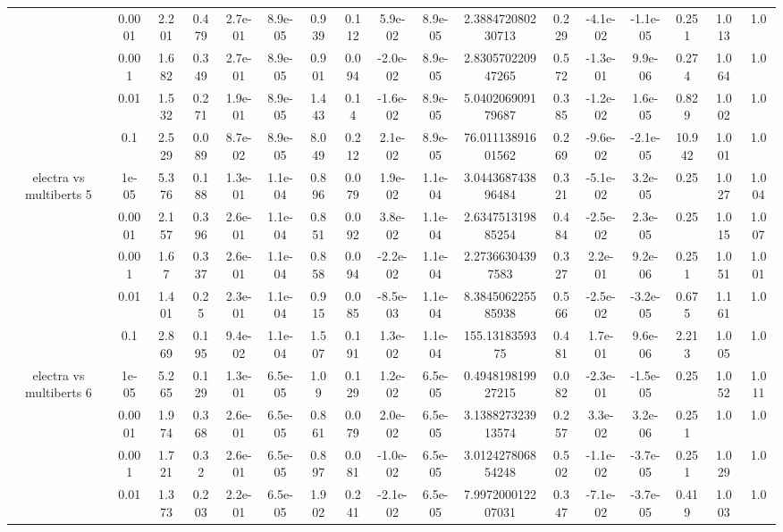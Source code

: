 \begin{tabular}{|c|c|c|c|c|c|c|c|c|c|c|c|c|c|c|c|c|}
 & 0.0001 & 2.201 & 0.479 & 2.7e-01 & 8.9e-05 & 0.939 & 0.112 & 5.9e-02 & 8.9e-05 & 2.388472080230713 & 0.229 & -4.1e-02 & -1.1e-05 & 0.251 & 1.013 & 1.0 \\
 & 0.001 & 1.682 & 0.349 & 2.7e-01 & 8.9e-05 & 0.901 & 0.094 & -2.0e-02 & 8.9e-05 & 2.830570220947265 & 0.572 & -1.3e-01 & 9.9e-06 & 0.274 & 1.064 & 1.0 \\
 & 0.01 & 1.532 & 0.271 & 1.9e-01 & 8.9e-05 & 1.443 & 0.14 & -1.6e-02 & 8.9e-05 & 5.040206909179687 & 0.385 & -1.2e-02 & 1.6e-05 & 0.829 & 1.002 & 1.0 \\
 & 0.1 & 2.529 & 0.089 & 8.7e-02 & 8.9e-05 & 8.049 & 0.212 & 2.1e-02 & 8.9e-05 & 76.01113891601562 & 0.269 & -9.6e-02 & -2.1e-05 & 10.942 & 1.001 & 1.0 \\
\hline
\multirow{5}{*}{electra  vs multiberts 5} & 1e-05 & 5.376 & 0.188 & 1.3e-01 & 1.1e-04 & 0.896 & 0.079 & 1.9e-02 & 1.1e-04 & 3.044368743896484 & 0.321 & -5.1e-02 & 3.2e-05 & 0.25 & 1.027 & 1.004 \\
 & 0.0001 & 2.157 & 0.396 & 2.6e-01 & 1.1e-04 & 0.851 & 0.092 & 3.8e-02 & 1.1e-04 & 2.634751319885254 & 0.484 & -2.5e-02 & 2.3e-05 & 0.25 & 1.015 & 1.007 \\
 & 0.001 & 1.67 & 0.337 & 2.6e-01 & 1.1e-04 & 0.858 & 0.094 & -2.2e-02 & 1.1e-04 & 2.27366304397583 & 0.327 & 2.2e-01 & 9.2e-06 & 0.251 & 1.051 & 1.001 \\
 & 0.01 & 1.401 & 0.25 & 2.3e-01 & 1.1e-04 & 0.915 & 0.085 & -8.5e-03 & 1.1e-04 & 8.384506225585938 & 0.566 & -2.5e-02 & -3.2e-05 & 0.675 & 1.161 & 1.0 \\
 & 0.1 & 2.869 & 0.195 & 9.4e-02 & 1.1e-04 & 1.507 & 0.191 & 1.3e-02 & 1.1e-04 & 155.1318359375 & 0.481 & 1.7e-01 & 9.6e-06 & 2.213 & 1.005 & 1.0 \\
\hline
\multirow{5}{*}{electra  vs multiberts 6} & 1e-05 & 5.265 & 0.129 & 1.3e-01 & 6.5e-05 & 1.09 & 0.129 & 1.2e-02 & 6.5e-05 & 0.494819819927215 & 0.082 & -2.3e-01 & -1.5e-05 & 0.25 & 1.052 & 1.011 \\
 & 0.0001 & 1.974 & 0.368 & 2.6e-01 & 6.5e-05 & 0.861 & 0.079 & 2.0e-02 & 6.5e-05 & 3.138827323913574 & 0.257 & 3.3e-02 & 3.2e-06 & 0.251 & 1.0 & 1.0 \\
 & 0.001 & 1.721 & 0.32 & 2.6e-01 & 6.5e-05 & 0.897 & 0.081 & -1.0e-02 & 6.5e-05 & 3.012427806854248 & 0.502 & -1.1e-02 & -3.7e-05 & 0.251 & 1.029 & 1.0 \\
 & 0.01 & 1.373 & 0.203 & 2.2e-01 & 6.5e-05 & 1.902 & 0.241 & -2.1e-02 & 6.5e-05 & 7.997200012207031 & 0.347 & -7.1e-02 & -3.7e-05 & 0.419 & 1.003 & 1.0 \\

\end{tabular}
